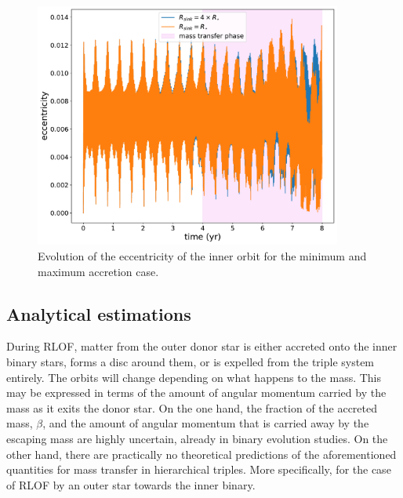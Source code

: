\begin{figure}[H]
    \centering
    \includegraphics[width=0.9\textwidth]{Thesis/graphs/accretion_case/accretion_inner_ecc.pdf}
    \caption{Evolution of the eccentricity of the inner orbit for the minimum and maximum accretion case.}
    \label{fig:accretion_inner_ecc}
\end{figure}

\subsection{Analytical estimations}

During RLOF, matter from the outer donor star is either accreted onto the inner binary stars, forms a disc around them, or is expelled from the triple system entirely. The orbits will change depending on what happens to the mass. This may be expressed in terms of the amount of angular momentum carried by the mass as it exits the donor star. On the one hand, the fraction of the accreted mass, $\beta$, and the amount of angular momentum that is carried away by the escaping mass are highly uncertain, already in binary evolution studies. On the other hand, there are practically no theoretical predictions of the aforementioned quantities for mass transfer in hierarchical triples. More specifically, for the case of RLOF by an outer star towards the inner binary. 

